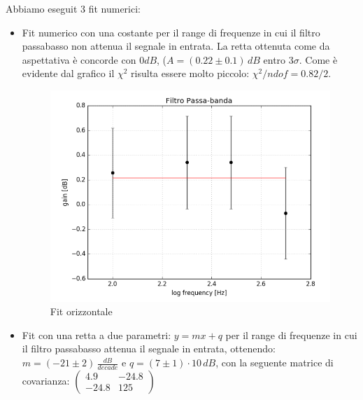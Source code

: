 \documentclass[10pt,a4paper]{article}
\begin{document}
Abbiamo eseguit 3 fit numerici:\\
\begin{itemize}
\item
Fit numerico con una costante per il range di frequenze in cui il filtro passabasso non attenua il segnale in entrata. 
La retta ottenuta come da aspettativa è concorde con $0dB$, ($A = (0.22 \pm 0.1) \, dB$ entro $3\sigma$. Come è evidente dal grafico il $\chi^2$ risulta essere molto piccolo: $\chi^2/ndof = 0.82/2$.

\begin{figure}[h]
\centering
\includegraphics[scale=0.4]{immagine1.png}
\caption{Fit orizzontale}
\end{figure}

\item
Fit con una retta a due parametri: $y = mx + q$ per il range di frequenze in cui il filtro passabasso attenua il segnale in entrata, ottenendo: $m = (-21 \pm 2) \, \frac{dB}{decade}$ e $q = (7 \pm 1) \cdot 10 \, dB$, con la seguente matrice di covarianza:
$\left(\begin{array}{cc}
4.9 & -24.8 \\ 
-24.8 & 125
\end{array}\right)$


\end{itemize}
\end{document}
